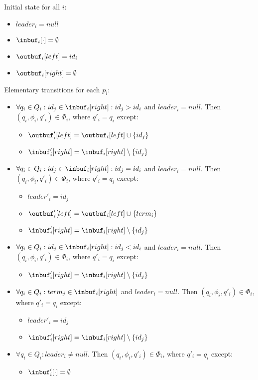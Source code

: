 Initial state for all $i$:
\begin{itemize}
\item $leader_i = null$
\item $\inbuf_i[\cdot] = \emptyset$
\item $\outbuf_i[left] = id_i$
\item $\outbuf_i[right] = \emptyset$
\end{itemize}

Elementary transitions for each $p_i$:
\begin{itemize}
\item $\forall q_i \in Q_i: id_j \in \inbuf_i[right]: id_j > id_i$ and $leader_i = null$.
      Then $(q_i, \phi_i, q'_i) \in \Phi_i$,
      where $q'_i = q_i$ except:
      \begin{itemize}
      \item $\outbuf'_i[left] = \outbuf_i[left] \cup \{id_j\}$
      \item $\inbuf'_i[right] = \inbuf_i[right] \setminus \{id_j\}$
      \end{itemize}
\item $\forall q_i \in Q_i: id_j \in \inbuf_i[right]: id_j = id_i$ and $leader_i = null$.
      Then $(q_i, \phi_i, q'_i) \in \Phi_i$,
      where $q'_i = q_i$ except:
      \begin{itemize}
      \item $leader'_i = id_j$
      \item $\outbuf'_i[left] = \outbuf_i[left] \cup \{term_i\}$
      \item $\inbuf'_i[right] = \inbuf_i[right] \setminus \{id_j\}$
      \end{itemize}
\item $\forall q_i \in Q_i: id_j \in \inbuf_i[right]: id_j < id_i$ and $leader_i = null$.
      Then $(q_i, \phi_i, q'_i) \in \Phi_i$,
      where $q'_i = q_i$ except:
      \begin{itemize}
      \item $\inbuf'_i[right] = \inbuf_i[right] \setminus \{id_j\}$
      \end{itemize}
\item $\forall q_i \in Q_i: term_j \in \inbuf_i[right]$ and $leader_i = null$.
      Then $(q_i, \phi_i, q'_i) \in \Phi_i$,
      where $q'_i = q_i$ except:
      \begin{itemize}
      \item $leader'_i = id_j$
      \item $\inbuf'_i[right] = \inbuf_i[right] \setminus \{id_j\}$
      \end{itemize}
\item $\forall q_i \in Q_i: leader_i \neq null$.
      Then $(q_i, \phi_i, q'_i) \in \Phi_i$,
      where $q'_i = q_i$ except:
      \begin{itemize}
      \item $\inbuf'_i[\cdot] = \emptyset$
      \end{itemize}
\end{itemize}

